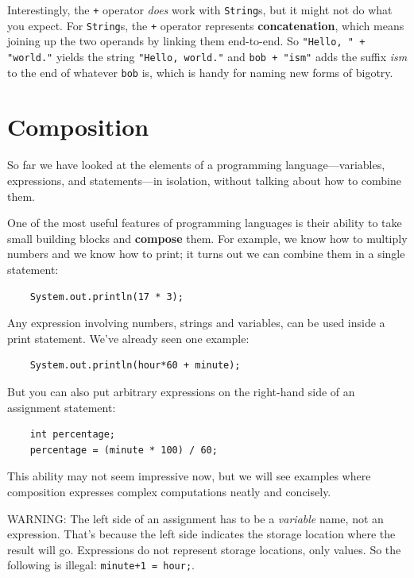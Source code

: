 
Interestingly, the {\tt +} operator {\em does} work with
{\tt String}s, but it might not do what you expect.
For {\tt String}s, the {\tt +} operator represents {\bf concatenation},
which means joining up the two operands by linking them
end-to-end.  So {\tt "Hello, " + "world."} yields the string
{\tt "Hello, world."} and {\tt bob + "ism"} adds the suffix
{\em ism} to the end of whatever {\tt bob} is, which is
handy for naming new forms of bigotry.


\section{Composition}

So far we have looked at the elements of a programming
language---variables, expressions, and statements---in
isolation, without talking about how to combine them.

One of the most useful features of programming languages
is their ability to take small building blocks and
{\bf compose} them.  For example, we know how to multiply
numbers and we know how to print; it turns out we can
combine them in a single statement:

\begin{lstlisting}
    System.out.println(17 * 3);
\end{lstlisting}
%
Any expression involving numbers, strings
and variables, can be used inside a print statement.  We've
already seen one example:

\begin{lstlisting}
    System.out.println(hour*60 + minute);
\end{lstlisting}
%
But you can also put arbitrary expressions on the right-hand
side of an assignment statement:

\begin{lstlisting}
    int percentage;
    percentage = (minute * 100) / 60;
\end{lstlisting}
%
This ability may not seem impressive now, but we will see
examples where composition
expresses complex computations neatly and concisely.

WARNING: The left side of an assignment
has to be a {\em variable} name, not an expression.
That's because the left side indicates the storage location
where the result will go.  Expressions
do not represent storage locations, only values.  So the
following is illegal:  {\tt minute+1 = hour;}.

